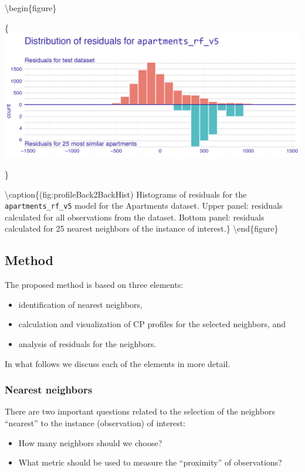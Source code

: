 \documentclass[12pt,]{krantz}
\providecommand{\tightlist}{%
  \setlength{\itemsep}{0pt}\setlength{\parskip}{0pt}}
\begin{document}
\textbackslash{}begin\{figure\}

\{\centering \includegraphics[width=0.7\linewidth]{figure/bb_hist}

\}

\textbackslash{}caption\{(fig:profileBack2BackHist) Histograms of residuals for the \texttt{apartments\_rf\_v5} model for the Apartments dataset. Upper panel: residuals calculated for all observations from the dataset. Bottom panel: residuals calculated for 25 nearest neighbors of the instance of interest.\}\label{fig:profileBack2BackHist}
\textbackslash{}end\{figure\}

\hypertarget{cPLocDiagMethod}{%
\subsection{Method}\label{cPLocDiagMethod}}

The proposed method is based on three elements:

\begin{itemize}
\tightlist
\item
  identification of nearest neighbors,
\item
  calculation and visualization of CP profiles for the selected neighbors, and
\item
  analysis of residuals for the neighbors.
\end{itemize}

In what follows we discuss each of the elements in more detail.

\hypertarget{cPLocDiagNeighbors}{%
\subsubsection{Nearest neighbors}\label{cPLocDiagNeighbors}}

There are two important questions related to the selection of the neighbors ``nearest'' to the instance (observation) of interest:

\begin{itemize}
\tightlist
\item
  How many neighbors should we choose?
\item
  What metric should be used to measure the ``proximity'' of observations?
\end{itemize}
\end{document}
